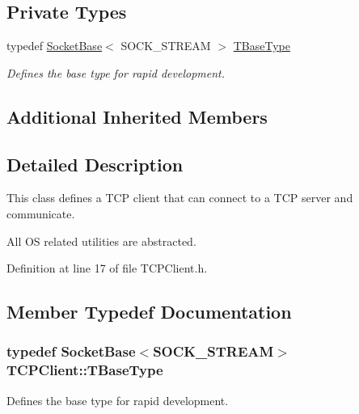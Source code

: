 \subsection*{Private Types}
\begin{DoxyCompactItemize}
\item 
typedef \hyperlink{class_socket_base}{Socket\-Base}$<$ S\-O\-C\-K\-\_\-\-S\-T\-R\-E\-A\-M $>$ \hyperlink{class_t_c_p_client_a562f13657068ebb1bf1d33fb1d562cbf}{T\-Base\-Type}
\begin{DoxyCompactList}\small\item\em Defines the base type for rapid development. \end{DoxyCompactList}\end{DoxyCompactItemize}
\subsection*{Additional Inherited Members}


\subsection{Detailed Description}
This class defines a T\-C\-P client that can connect to a T\-C\-P server and communicate. 

All O\-S related utilities are abstracted. 

Definition at line 17 of file T\-C\-P\-Client.\-h.



\subsection{Member Typedef Documentation}
\hypertarget{class_t_c_p_client_a562f13657068ebb1bf1d33fb1d562cbf}{
\subsubsection[{T\-Base\-Type}]{\setlength{\rightskip}{0pt plus 5cm}typedef {\bf Socket\-Base}$<$S\-O\-C\-K\-\_\-\-S\-T\-R\-E\-A\-M$>$ {\bf T\-C\-P\-Client\-::\-T\-Base\-Type}\hspace{0.3cm}{\ttfamily [private]}}}\label{class_t_c_p_client_a562f13657068ebb1bf1d33fb1d562cbf}


Defines the base type for rapid development. 



